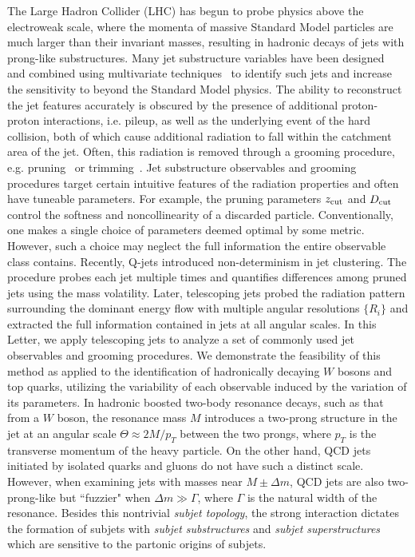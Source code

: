 \documentclass[aps,prl,floatfix,preprintnumbers,twocolumn,groupedaddress,nofootinbib]{revtex4-1}
\begin{document}
The Large Hadron Collider (LHC) has begun to probe physics above the electroweak scale, where the momenta of massive Standard Model particles are much larger than their invariant masses, resulting in hadronic decays of jets with prong-like substructures. Many jet substructure variables have been designed~\cite{Abdesselam:2010pt,Altheimer:2012mn,Altheimer:2013yza} and combined using multivariate techniques~\cite{Adams:2015hiv,Larkoski:2017jix,ATLAS-CONF-2017-064,Khachatryan:1955546} to identify such jets and increase the sensitivity to beyond the Standard Model physics. The ability to reconstruct the jet features accurately is obscured by the presence of additional proton-proton interactions, i.e. pileup, as well as the underlying event of the hard collision, both of which cause additional radiation to fall within the catchment area of the jet. Often, this radiation is removed through a grooming procedure, e.g. pruning~\cite{Ellis:2009su} or trimming~\cite{Krohn:2009th}. Jet substructure observables and grooming procedures target certain intuitive features of the radiation properties and often have tuneable parameters. For example, the pruning parameters $z_{\rm cut}$ and $D_{\rm cut}$ control the softness and noncollinearity of a discarded particle. Conventionally, one makes a single choice of parameters deemed optimal by some metric. However, such a choice may neglect the full information the entire observable class contains.
\newline \indent Recently, Q-jets \cite{Ellis:2012sn} introduced non-determinism in jet clustering. The procedure probes each jet multiple times and quantifies differences among pruned jets using the mass volatility. Later, telescoping jets \cite{Chien:2014hla} probed the radiation pattern surrounding the dominant energy flow with multiple angular resolutions $\{R_i\}$ and extracted the full information contained in jets at all angular scales. In this Letter, we apply telescoping jets to analyze a set of commonly used jet observables and grooming procedures. We demonstrate the feasibility of this method as applied to the identification of hadronically decaying $W$ bosons and top quarks, utilizing the variability of each observable induced by the variation of its parameters.
\newline \indent In hadronic boosted two-body resonance decays, such as that from a $W$ boson, the resonance mass $M$ introduces a two-prong structure in the jet at an angular scale $\Theta\approx 2M/p_T$ between the two prongs, where $p_T$ is the transverse momentum of the heavy particle. On the other hand, QCD jets initiated by isolated quarks and gluons do not have such a distinct scale. However, when examining jets with masses near $M\pm\Delta m$, QCD jets are also two-prong-like but ``fuzzier" when $\Delta m\gg\Gamma$, where $\Gamma$ is the natural width of the resonance. Besides this nontrivial {\sl subjet topology}, the strong interaction dictates the formation of subjets with {\sl subjet substructures} and {\sl subjet superstructures} \cite{Gallicchio:2010sw} which are sensitive to the partonic origins of subjets.
\end{document}
